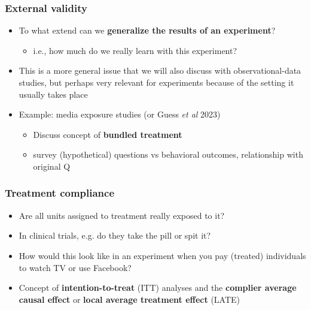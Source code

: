 \documentclass[aspectratio=43]{beamer}
\begin{document}
\begin{frame}
\frametitle{External validity}
\centering

\begin{itemize}
  \item To what extend can we \textbf{generalize the results of an experiment}?
  \begin{itemize}
    \item i.e., how much do we really learn with this experiment?
  \end{itemize}
  \item This is a more general issue that we will also discuss with observational-data studies, but perhaps very relevant for experiments because of the setting it usually takes place
  \item Example: media exposure studies (or Guess \textit{et al} 2023)
  \begin{itemize}
    \item {} Discuss concept of \textbf{bundled treatment}
    \item {} survey (hypothetical) questions vs behavioral outcomes, relationship with original Q
  \end{itemize}
\end{itemize}

\end{frame}

\begin{frame}
\frametitle{Treatment compliance}
\centering

\begin{itemize}
  \item Are all units assigned to treatment really exposed to it?
  \item In clinical trials, e.g. do they take the pill or spit it?
  \item How would this look like in an experiment when you pay (treated) individuals to watch TV or use Facebook?
  \item Concept of \textbf{intention-to-treat} (ITT) analyses and the \textbf{complier average causal effect} or \textbf{local average treatment effect} (LATE)
\end{itemize}

\end{frame}
\end{document}
